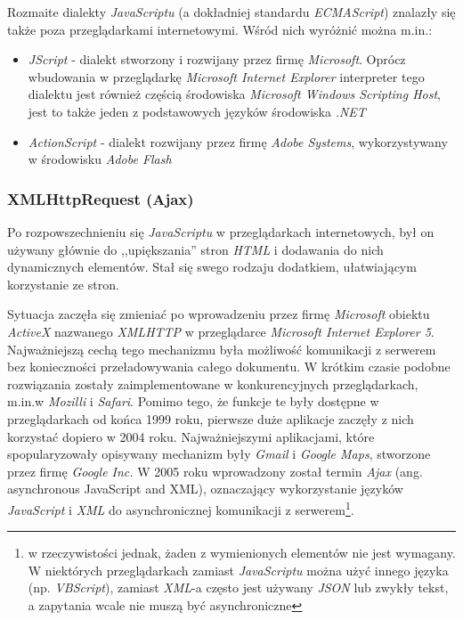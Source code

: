 \documentclass[a4paper,12pt]{article}
\begin{document}
Rozmaite dialekty \emph{JavaScriptu} (a dokładniej standardu
\emph{ECMAScript}) znalazły się także poza przeglądarkami
internetowymi. Wśród nich wyróżnić można m.in.:

\begin{itemize}
\item \emph{JScript} - dialekt stworzony i rozwijany przez firmę
  \emph{Microsoft}. Oprócz wbudowania w przeglądarkę \emph{Microsoft
    Internet Explorer} interpreter tego dialektu jest również częścią
  środowiska \emph{Microsoft Windows Scripting Host}, jest to także
  jeden z podstawowych języków środowiska \emph{.NET}
\item \emph{ActionScript} - dialekt rozwijany przez firmę \emph{Adobe
    Systems}, wykorzystywany w środowisku \emph{Adobe Flash}
\end{itemize}

\subsubsection{XMLHttpRequest (Ajax)}
Po rozpowszechnieniu się \emph{JavaScriptu} w przeglądarkach
internetowych, był on używany głównie do ,,upiększania'' stron
\emph{HTML} i dodawania do nich dynamicznych elementów. Stał się swego
rodzaju dodatkiem, ułatwiającym korzystanie ze stron.

Sytuacja zaczęła się zmieniać po wprowadzeniu przez firmę
\emph{Microsoft} obiektu \emph{ActiveX} nazwanego \emph{XMLHTTP} w
przeglądarce \emph{Microsoft Internet Explorer 5}. Najważniejszą cechą
tego mechanizmu była możliwość komunikacji z serwerem bez konieczności
przeładowywania całego dokumentu. W krótkim czasie podobne rozwiązania
zostały zaimplementowane w konkurencyjnych przeglądarkach, m.in.w
\emph{Mozilli} i \emph{Safari}. Pomimo tego, że funkcje te były
dostępne w przeglądarkach od końca 1999 roku, pierwsze duże aplikacje
zaczęły z nich korzystać dopiero w 2004 roku. Najważniejszymi
aplikacjami, które spopularyzowały opisywany mechanizm były
\emph{Gmail} i \emph{Google Maps}, stworzone przez firmę \emph{Google
  Inc.} W 2005 roku wprowadzony został termin \emph{Ajax}
(ang. asynchronous JavaScript and XML), oznaczający wykorzystanie
języków \emph{JavaScript} i \emph{XML} do asynchronicznej komunikacji
z serwerem\footnote{w rzeczywistości jednak, żaden z wymienionych
  elementów nie jest wymagany. W niektórych przeglądarkach zamiast
  \emph{JavaScriptu} można użyć innego języka (np. \emph{VBScript}),
  zamiast \emph{XML}-a często jest używany \emph{JSON} lub zwykły
  tekst, a zapytania wcale nie muszą być asynchroniczne\cite{ajax}}.
\end{document}
